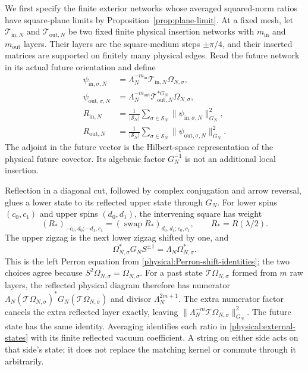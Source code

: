 We first specify the finite exterior networks whose averaged squared-norm
ratios have square-plane limits by Proposition~\ref{prop:plane-limit}.
At a fixed mesh, let \(\mathcal T_{\mathrm{in},N}\) and
\(\mathcal T_{\mathrm{out},N}\) be two fixed finite physical insertion
networks with \(m_{\mathrm{in}}\) and \(m_{\mathrm{out}}\) layers.  Their
layers are the square-medium steps \(\pm\pi/4\), and their inserted matrices
are supported on finitely many physical edges.  Read the future network
in its actual future orientation and define
\begin{equation}\label{physical:external-states}
 \begin{aligned}
 \psi_{\mathrm{in},\sigma,N}
 &=\Lambda_N^{-m_{\mathrm{in}}}\mathcal T_{\mathrm{in},N}\Omega_{N,\sigma},\\
 \psi_{\mathrm{out},\sigma,N}
 &=\Lambda_N^{-m_{\mathrm{out}}}
     \mathcal T_{\mathrm{out},N}^{*G_N}\Omega_{N,\sigma},\\
 R_{\mathrm{in},N}
 &=\frac1{|\mathcal S_N|}\sum_{\sigma\in\mathcal S_N}
      \|\psi_{\mathrm{in},\sigma,N}\|_{G_N}^2,\\
 R_{\mathrm{out},N}
 &=\frac1{|\mathcal S_N|}\sum_{\sigma\in\mathcal S_N}
      \|\psi_{\mathrm{out},\sigma,N}\|_{G_N}^2.
 \end{aligned}
\end{equation}
The adjoint in the future vector is the Hilbert-space representation of
the physical future covector.  Its algebraic factor \(G_N^{-1}\) is not
an additional local insertion.

Reflection in a diagonal cut, followed by complex conjugation and arrow
reversal, glues a lower state to its reflected upper state through \(G_N\).
For lower spins \((c_0,c_1)\) and upper spins \((d_0,d_1)\), the intervening
square has weight
\[
 (R_*)_{-c_0,d_0;-d_1,c_1}
 =(\operatorname{swap}R_*)_{d_0,d_1;c_0,c_1},\qquad R_*=R(\lambda/2).
\]
The upper zigzag is the next lower zigzag shifted by one, and
\begin{equation}\label{physical:left-vacuum}
 \Omega_{N,\sigma}^*G_NS^{\pm1}=\Lambda_N\Omega_{N,\sigma}^*.
\end{equation}
This is the left Perron equation from
\eqref{physical:Perron-shift-identities}; the two choices agree because
\(S^2\Omega_{N,\sigma}=\Omega_{N,\sigma}\).
For a past state \(\mathcal T\Omega_{N,\sigma}\) formed from \(m\) raw
layers, the reflected physical diagram therefore has numerator
\(\Lambda_N(\mathcal T\Omega_{N,\sigma})^*G_N
(\mathcal T\Omega_{N,\sigma})\) and divisor \(\Lambda_N^{2m+1}\).
The extra numerator factor cancels the extra reflected layer exactly,
leaving \(\|\Lambda_N^{-m}\mathcal T\Omega_{N,\sigma}\|_{G_N}^2\).
The future state has the same identity.  Averaging identifies each ratio
in \eqref{physical:external-states} with its finite reflected vacuum
coefficient.  A string on either side acts on that side's state; it does
not replace the matching kernel or commute through it arbitrarily.

